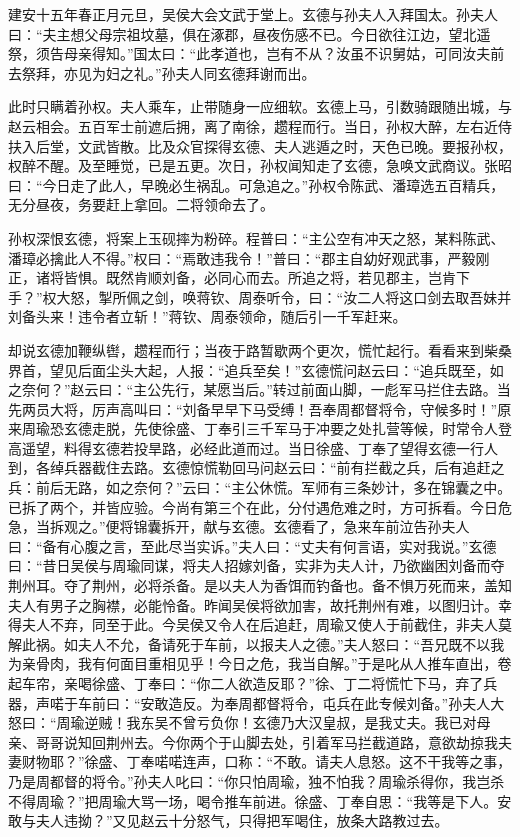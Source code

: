 建安十五年春正月元旦，吴侯大会文武于堂上。玄德与孙夫人入拜国太。孙夫人曰：“夫主想父母宗祖坟墓，俱在涿郡，昼夜伤感不已。今日欲往江边，望北遥祭，须告母亲得知。”国太曰：“此孝道也，岂有不从？汝虽不识舅姑，可同汝夫前去祭拜，亦见为妇之礼。”孙夫人同玄德拜谢而出。

此时只瞒着孙权。夫人乘车，止带随身一应细软。玄德上马，引数骑跟随出城，与赵云相会。五百军士前遮后拥，离了南徐，趱程而行。当日，孙权大醉，左右近侍扶入后堂，文武皆散。比及众官探得玄德、夫人逃遁之时，天色已晚。要报孙权，权醉不醒。及至睡觉，已是五更。次日，孙权闻知走了玄德，急唤文武商议。张昭曰：“今日走了此人，早晚必生祸乱。可急追之。”孙权令陈武、潘璋选五百精兵，无分昼夜，务要赶上拿回。二将领命去了。

孙权深恨玄德，将案上玉砚摔为粉碎。程普曰：“主公空有冲天之怒，某料陈武、潘璋必擒此人不得。”权曰：“焉敢违我令！”普曰：“郡主自幼好观武事，严毅刚正，诸将皆惧。既然肯顺刘备，必同心而去。所追之将，若见郡主，岂肯下手？”权大怒，掣所佩之剑，唤蒋钦、周泰听令，曰：“汝二人将这口剑去取吾妹并刘备头来！违令者立斩！”蒋钦、周泰领命，随后引一千军赶来。

却说玄德加鞭纵辔，趱程而行；当夜于路暂歇两个更次，慌忙起行。看看来到柴桑界首，望见后面尘头大起，人报：“追兵至矣！”玄德慌问赵云曰：“追兵既至，如之奈何？”赵云曰：“主公先行，某愿当后。”转过前面山脚，一彪军马拦住去路。当先两员大将，厉声高叫曰：“刘备早早下马受缚！吾奉周都督将令，守候多时！”原来周瑜恐玄德走脱，先使徐盛、丁奉引三千军马于冲要之处扎营等候，时常令人登高遥望，料得玄德若投旱路，必经此道而过。当日徐盛、丁奉了望得玄德一行人到，各绰兵器截住去路。玄德惊慌勒回马问赵云曰：“前有拦截之兵，后有追赶之兵：前后无路，如之奈何？”云曰：“主公休慌。军师有三条妙计，多在锦囊之中。已拆了两个，并皆应验。今尚有第三个在此，分付遇危难之时，方可拆看。今日危急，当拆观之。”便将锦囊拆开，献与玄德。玄德看了，急来车前泣告孙夫人曰：“备有心腹之言，至此尽当实诉。”夫人曰：“丈夫有何言语，实对我说。”玄德曰：“昔日吴侯与周瑜同谋，将夫人招嫁刘备，实非为夫人计，乃欲幽困刘备而夺荆州耳。夺了荆州，必将杀备。是以夫人为香饵而钓备也。备不惧万死而来，盖知夫人有男子之胸襟，必能怜备。昨闻吴侯将欲加害，故托荆州有难，以图归计。幸得夫人不弃，同至于此。今吴侯又令人在后追赶，周瑜又使人于前截住，非夫人莫解此祸。如夫人不允，备请死于车前，以报夫人之德。”夫人怒曰：“吾兄既不以我为亲骨肉，我有何面目重相见乎！今日之危，我当自解。”于是叱从人推车直出，卷起车帘，亲喝徐盛、丁奉曰：“你二人欲造反耶？”徐、丁二将慌忙下马，弃了兵器，声喏于车前曰：“安敢造反。为奉周都督将令，屯兵在此专候刘备。”孙夫人大怒曰：“周瑜逆贼！我东吴不曾亏负你！玄德乃大汉皇叔，是我丈夫。我已对母亲、哥哥说知回荆州去。今你两个于山脚去处，引着军马拦截道路，意欲劫掠我夫妻财物耶？”徐盛、丁奉喏喏连声，口称：“不敢。请夫人息怒。这不干我等之事，乃是周都督的将令。”孙夫人叱曰：“你只怕周瑜，独不怕我？周瑜杀得你，我岂杀不得周瑜？”把周瑜大骂一场，喝令推车前进。徐盛、丁奉自思：“我等是下人。安敢与夫人违拗？”又见赵云十分怒气，只得把军喝住，放条大路教过去。

